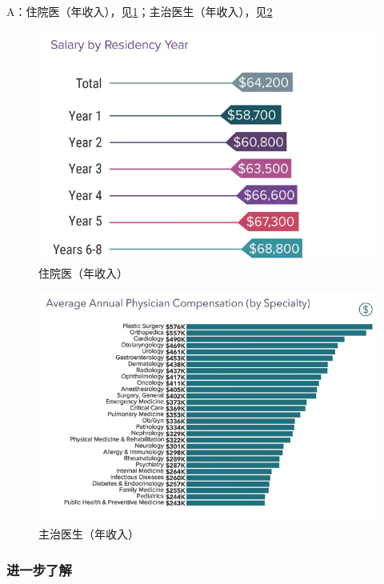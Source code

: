\documentclass[zihao=-4,fontset=none]{Beautybook-CN}
\begin{document}
\begin{enumerate}
A：住院医（年收入），见\ref{fig:resident}；主治医生（年收入），见\ref{fig:attending}
\begin{figure}[htbp]
    \centering
    \includegraphics[width=\linewidth]{media/image4.png}
    \caption{住院医（年收入）}
    \label{fig:resident}
\end{figure}
\begin{figure}[htbp]
    \centering
    \includegraphics[width=\linewidth]{media/image5.png}
    \caption{主治医生（年收入）}
    \label{fig:attending}
\end{figure}
\end{enumerate}
\subsubsection{进一步了解}
\end{document}
